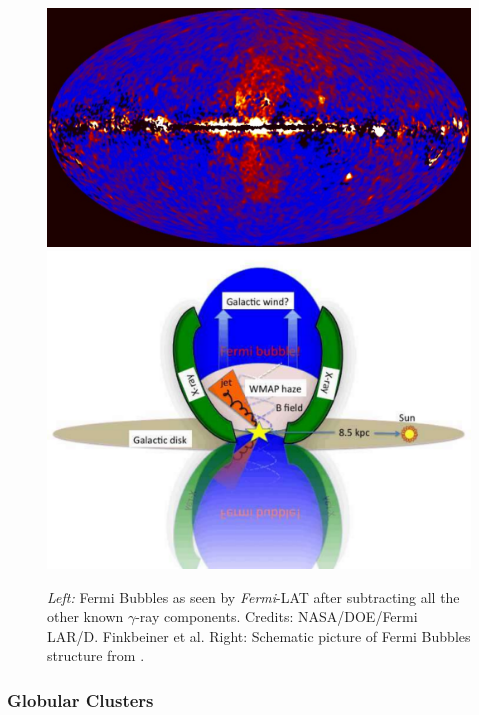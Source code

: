 \documentclass[main.tex]{subfiles}
\begin{document}
\begin{figure}[!htb]
\includegraphics[width=\linewidth]{Pictures/fermi_bubb.jpg}
\endminipage\hfill
{}
\includegraphics[width=\linewidth]{Pictures/diagramfbubbles.pdf}
\endminipage\hfill
\caption{\label{fig:fbubbles} \textit{Left:} Fermi Bubbles as seen by \textit{Fermi}-LAT after subtracting all the other known $\gamma$-ray components. Credits: NASA/DOE/Fermi LAR/D. Finkbeiner et al. Right: Schematic picture of Fermi Bubbles structure from \cite{2010Afbubblesdiscovery}.}
\end{figure}

\subsubsection{Globular Clusters}
\end{document}
